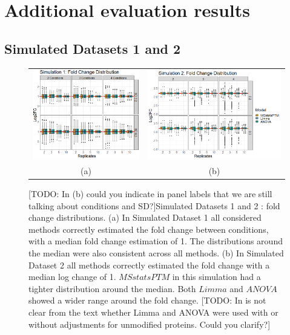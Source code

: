 \documentclass{mcp}
\def\todo#1{{\color{red}[TODO: #1]}}
\begin{document}
\clearpage
\section{Additional evaluation results}
\label{sec:experiments}

\subsection{Simulated Datasets 1 and 2}

\begin{figure}[ht]
\centering
 \begin{tabular}{cc}
	\includegraphics[width=.445\textwidth]{sim_new/sim1_FC_boxplot}
	&
	\includegraphics[width=.56\textwidth]{sim_new/sim3_FC_boxplot}\\
	(a)&(b)
\end{tabular}
\caption{\todo{In (b) could you indicate in panel labels that we are still talking about conditions and SD?}Simulated Datasets 1 and 2 : fold change distributions. (a) In Simulated Dataset 1 all considered methods correctly estimated the fold change between conditions, with a median fold change estimation of 1. The distributions around the median were also consistent across all methods. (b) In Simulated Dataset 2 all methods correctly estimated the fold change with a median log change of 1. $MSstatsPTM$ in this simulation had a  tighter distribution around the median. Both $Limma$ and $ANOVA$ showed a wider range around the fold change. \todo{In is not clear from the text whether Limma and ANOVA were used with or without adjustments for unmodified proteins. Could you clarify?}}
\label{fig:fc_boxplot}
\end{figure}
\end{document}
